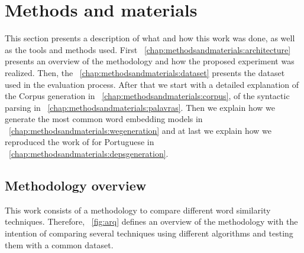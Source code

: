 \section{Methods and materials}\label{chap:methodsandmaterials}

This section presents a description of what and how this work was done, as well as the tools and methods used. First ~\autoref{chap:methodsandmaterials:architecture} presents an overview of the methodology and how the proposed experiment was realized. Then, the ~\autoref{chap:methodsandmaterials:dataset} presents the dataset used in the evaluation process. After that we start with a detailed explanation of the Corpus generation in ~\autoref{chap:methodsandmaterials:corpus}, of the syntactic parsing in ~\autoref{chap:methodsandmaterials:palavras}. Then we explain how we generate the most common word embedding models in ~\autoref{chap:methodsandmaterials:wegeneration} and at last we explain how we reproduced the work of  for Portuguese in ~\autoref{chap:methodsandmaterials:depsgeneration}.

\subsection{Methodology overview}\label{chap:methodsandmaterials:architecture}

This work consists of a methodology to compare different word similarity techniques. Therefore, ~\autoref{fig:arq} defines an overview of the methodology with the intention of comparing several techniques using different algorithms and testing them with a common dataset.

